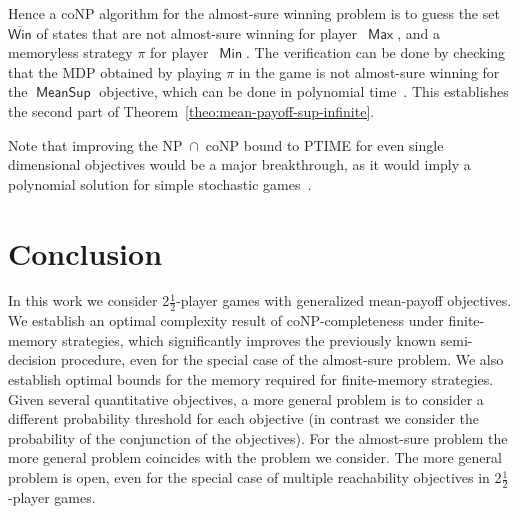\documentclass{article}
\newcommand{\half}{$\frac{\text{1}}{\text{2}}$}
\newcommand{\Win}{\mathsf{Win}}
\newcommand{\strab}{\pi}
\DeclareMathOperator{\ma}{\mathsf{Max}}
\DeclareMathOperator{\mi}{\mathsf{Min}}
\newcommand{\MeanSup}{\operatorname{\mathsf{MeanSup}}}
\begin{document}
Hence a coNP algorithm for the almost-sure winning problem is to guess
the set $\overline{\Win}$ of states that are not almost-sure winning for player~$\ma$,
and a memoryless strategy $\strab$ for player~$\mi$. The verification can be done 
by checking that the MDP obtained by playing $\strab$ in the game
is not almost-sure winning for the $\MeanSup$ objective, which can be done 
in polynomial time~\cite[Section~3.2]{BBCFK14}.
This establishes the second part of Theorem~\ref{theo:mean-payoff-sup-infinite}.



Note that improving the  NP~$\cap$~coNP bound to PTIME for even single dimensional objectives
would be a major breakthrough, as it would imply a polynomial solution for
simple stochastic games~\cite{Condon92}. 

\section{Conclusion}\label{sec:con}
In this work we consider 2\half-player games with generalized mean-payoff objectives.
We establish an optimal complexity result of coNP-completeness under finite-memory 
strategies, which significantly improves the previously known semi-decision procedure, 
even for the special case of the almost-sure problem.
We also establish optimal bounds for the memory required for finite-memory strategies.
Given several quantitative objectives, a more general problem is to consider
a different probability threshold for each objective (in contrast we consider
the probability of the conjunction of the objectives).
For the almost-sure problem the more general problem coincides with the problem
we consider. 
The more general problem is open, even for the special case of  
multiple reachability objectives in 2\half-player games.





\end{document}
